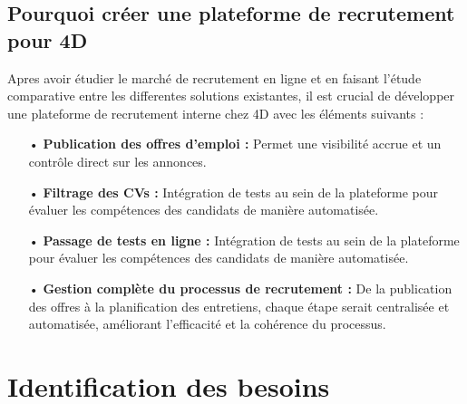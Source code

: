 \subsection{Pourquoi créer une plateforme de recrutement pour 4D}
Apres avoir étudier le marché de recrutement en ligne et en faisant l'étude comparative entre
les differentes solutions existantes, il est crucial de développer une plateforme 
de recrutement interne chez 4D avec les éléments suivants : \\

\begin{itemize}
   \item[ • ] \textbf{Publication des offres d'emploi :} Permet une visibilité accrue et un contrôle direct sur les annonces.\\
   \item[ • ] \textbf{Filtrage des CVs :} Intégration de tests au sein de la plateforme pour évaluer les compétences des candidats de manière automatisée. \\ 
   \item[ • ] \textbf{Passage de tests en ligne :}  Intégration de tests au sein de la plateforme pour évaluer les compétences des candidats de manière automatisée.\\ 
   \item[ • ] \textbf{Gestion complète du processus de recrutement :}  De la publication des offres à la planification des entretiens, chaque étape serait centralisée et automatisée, améliorant l'efficacité et la cohérence du processus. \\ 
\end{itemize} 

\section{Identification des besoins}



